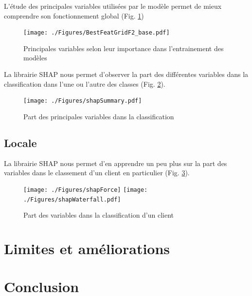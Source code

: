 \documentclass[12pt, a4paper]{article}
\begin{document}
L'étude des principales variables utilisées par le modèle permet de mieux comprendre son fonctionnement global (Fig. \ref{fig:BestFeat})

\begin{figure}[h]
    \begin{center}
        \texttt{[image: ./Figures/BestFeatGridF2\_base.pdf]}
    \end{center}
    \caption{Principales variables selon leur importance dans l'entrainement des modèles}
    \label{fig:BestFeat}
\end{figure}

La librairie SHAP nous permet d'observer la part des différentes variables dans la classification dans l'une ou l'autre des classes (Fig. \ref{fig:shapSummary}).

\begin{figure}[h]
    \begin{center}
        \texttt{[image: ./Figures/shapSummary.pdf]}
    \end{center}
    \caption{Part des principales variables dans la classification}
    \label{fig:shapSummary}
\end{figure}

\subsection{Locale}

La librairie SHAP nous permet d'en apprendre un peu plus sur la part des variables dans le classement d'un client en particulier (Fig. \ref{fig:shapWaterfall}).

\begin{figure}[h]
    \begin{center}
        \texttt{[image: ./Figures/shapForce]}
        \texttt{[image: ./Figures/shapWaterfall.pdf]}
    \end{center}
    \caption{Part des variables dans la classification d'un client}
    \label{fig:shapWaterfall}
\end{figure}

\section{Limites et améliorations}



\section{Conclusion}
\end{document}
